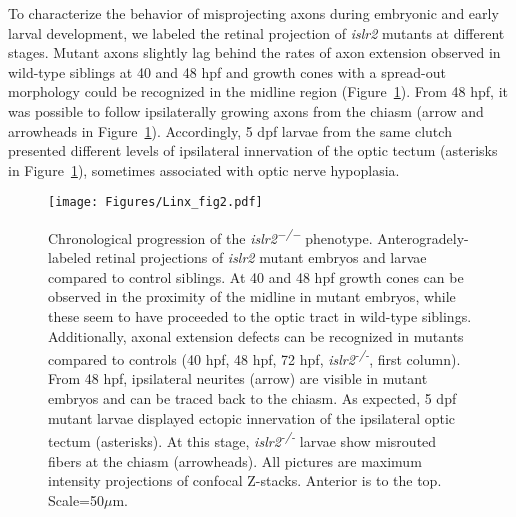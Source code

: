To characterize the behavior of misprojecting axons during embryonic and early larval development, we labeled the retinal projection of \emph{islr2} mutants at different stages.
Mutant axons slightly lag behind the rates of axon extension observed in wild-type siblings at 40 and 48 hpf and growth cones with a spread-out morphology could be recognized in the midline region (Figure~\ref{Linxfig2}).
From 48 hpf, it was possible to follow ipsilaterally growing axons from the chiasm (arrow and arrowheads in Figure~\ref{Linxfig2}).
Accordingly, 5 dpf larvae from the same clutch presented different levels of ipsilateral innervation of the optic tectum (asterisks in Figure~\ref{Linxfig2}), sometimes associated with optic nerve hypoplasia.
\begin{figure}[hbtp]
    \begin{center}
        \texttt{[image: Figures/Linx\_fig2.pdf]}
        \caption[Chronological progression of the \emph{islr2\textsuperscript{−/−}} phenotype.]
        {Chronological progression of the \emph{islr2\textsuperscript{−/−}} phenotype.
		Anterogradely-labeled retinal projections of \emph{islr2} mutant embryos and larvae compared to control siblings.
		At 40 and 48 hpf growth cones can be observed in the proximity of the midline in mutant embryos, while these seem to have proceeded to the optic tract in wild-type siblings.
		Additionally, axonal extension defects can be recognized in mutants compared to controls (40 hpf, 48 hpf, 72 hpf, \emph{islr2\textsuperscript{-/-}}, first column).
		From 48 hpf, ipsilateral neurites (arrow) are visible in mutant embryos and can be traced back to the chiasm.
		As expected, 5 dpf mutant larvae displayed ectopic innervation of the ipsilateral optic tectum (asterisks).
		At this stage, \emph{islr2\textsuperscript{-/-}} larvae show misrouted fibers at the chiasm (arrowheads).
		All pictures are maximum intensity projections of confocal Z-stacks.
		Anterior is to the top.
		Scale=50$\mu$m.
		}
        \label{Linxfig2}
    \end{center}
\end{figure}

